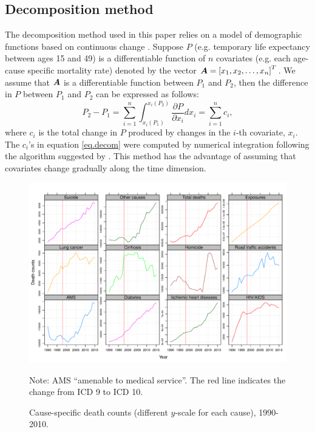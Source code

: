 \documentclass[11.5pt]{article}
\begin{document}
{\subsection*{Decomposition method}

The decomposition method used in this paper relies on a model of demographic functions based on continuous change \citep{horiuchi2008}. Suppose $P$ (e.g. temporary life expectancy between ages 15 and 49) is a differentiable function of $n$ covariates (e.g. each age-cause specific mortality rate) denoted by the vector $\boldsymbol{A} = \left[x_1,x_2,\ldots,x_n \right]^T$. We assume that $\boldsymbol{A}$ is a differentiable function between $P_1$ and $P_2$, then the difference in $P$ between $P_1$ and $P_2$ can be expressed as follows:
\begin{equation}
\label{eq.decom}
P_2-P_1 = \sum_{i = 1}^n \int_{x_i(P_1)}^{x_i(P_2)}\frac{\partial P}{\partial x_i}dx_i=\sum_{i = 1}^nc_i ,
\end{equation}
where $c_i$ is the total change in $P$ produced by changes in the $i$-th covariate, $x_i$. The $c_i$'s in equation \eqref{eq.decom} were computed by numerical integration following the algorithm suggested by \citet{horiuchi2008}. This method has the advantage of assuming that covariates change gradually along the time dimension.


\begin{figure}
\centering
\caption{Cause-specific death counts (different $y$-scale for each cause), 1990-2010.}
\label{fig:ClassSens}
\includegraphics[scale=.65]{Figures/Sensitivity_fig.pdf}

Note: AMS ``amenable to medical service''. The red line indicates the change from ICD 9 to ICD 10. 
\end{figure}

}
\end{document}
